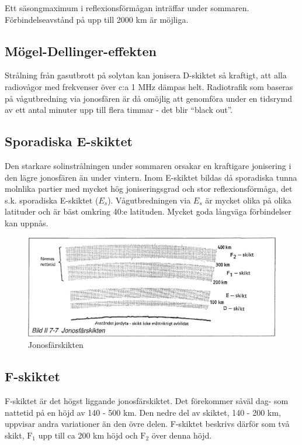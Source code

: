 Ett säsongmaximum i reflexionsförmågan inträffar under
sommaren. Förbindelseavstånd på upp till 2000 km är möjliga.

\subsection{Mögel-Dellinger-effekten}

Strålning från gasutbrott på solytan kan jonisera D-skiktet så
kraftigt, att alla radiovågor med frekvenser över c:a 1 MHz dämpas
helt.  Radiotrafik som baseras på vågutbredning via jonosfären är då
omöjlig att genomföra under en tidsrymd av ett antal minuter upp till
flera timmar - det blir ``black out''.

\subsection{Sporadiska E-skiktet}

Den starkare solinstrålningen under sommaren orsakar en kraftigare
jonisering i den lägre jonosfären än under vintern. Inom E-skiktet
bildas då sporadiska tunna molnlika partier med mycket hög
joniseringsgrad och stor reflexionsförmåga, det s.k. sporadiska
E-skiktet (\(E_s\)). Vågutbredningen via \(E_s\) är mycket olika på
olika latituder och är bäst omkring 40:e latituden. Mycket goda långväga
förbindelser kan uppnås.

\begin{figure}
  \includegraphics[width=\textwidth]{images/bild_2_7-07}
  \caption{Jonosfärskikten}
  \label{fig:bildII7-7}
\end{figure}

\subsection{F-skiktet}

F-skiktet är det högst liggande jonosfärskiktet. Det förekommer såväl
dag- som nattetid på en höjd av 140 - 500 km. Den nedre del av skiktet,
140 - 200 km, uppvisar andra variationer än den övre delen. F-skiktet
beskrivs därför som två skikt, \(\mathrm{F_1}\) upp till ca 200 km
höjd och \(\mathrm{F_2}\) över denna höjd.

